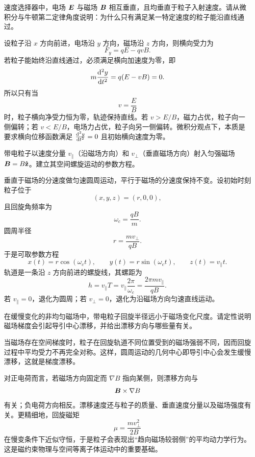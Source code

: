 \begin{classic}
速度选择器中，电场 $\vb*{E}$ 与磁场 $\vb*{B}$ 相互垂直，且均垂直于粒子入射速度。请从微积分与牛顿第二定律角度说明：为什么只有满足某一特定速度的粒子能沿直线通过。

\begin{center}
\end{center}

\begin{solution}
设粒子沿 $x$ 方向前进，电场沿 $y$ 方向，磁场沿 $z$ 方向，则横向受力为
\[
F_y=qE-qvB.
\]
若粒子能始终沿直线通过，必须满足横向加速度为零，即
\[
m\dv[2]{y}{t}=q(E-vB)=0.
\]
所以只有当
\[
v=\frac{E}{B}
\]
时，粒子横向净受力恒为零，轨迹保持直线。若 $v>E/B$，磁力占优，粒子向一侧偏转；若 $v<E/B$，电场力占优，粒子向另一侧偏转。微积分观点下，本质是要求横向位移函数满足 $\dv[2]{y}{t}=0$ 且初始横向速度为零。
\end{solution}
\end{classic}

\begin{competition}
带电粒子以速度分量 $v_\parallel$（沿磁场方向）和 $v_\perp$（垂直磁场方向）射入匀强磁场 $\vb*{B}=B\vu{z}$。建立其空间螺旋运动的参数方程。

\begin{solution}
垂直于磁场的分速度做匀速圆周运动，平行于磁场的分速度保持不变。设初始时刻粒子位于
\[
(x,y,z)=(r,0,0),
\]
且回旋角频率为
\[
\omega_c=\frac{qB}{m}.
\]
圆周半径
\[
r=\frac{mv_\perp}{qB}.
\]
于是可取参数方程
\[
x(t)=r\cos(\omega_c t),
\qquad
y(t)=r\sin(\omega_c t),
\qquad
z(t)=v_\parallel t.
\]
轨道是一条沿 $z$ 方向前进的螺旋线，其螺距为
\[
h=v_\parallel T=v_\parallel\frac{2\pi}{\omega_c}=\frac{2\pi mv_\parallel}{qB}.
\]
若 $v_\parallel=0$，退化为圆周；若 $v_\perp=0$，退化为沿磁场方向匀速直线运动。
\end{solution}
\end{competition}

\begin{competition}
在缓慢变化的非均匀磁场中，带电粒子回旋半径远小于磁场变化尺度。请定性说明磁场梯度会引起导引中心漂移，并给出漂移方向与哪些量有关。

\begin{solution}
当磁场存在空间梯度时，粒子在回旋轨道不同位置受到的磁场强弱不同，因而回旋过程中平均受力不再完全对称。这样，圆周运动的几何中心即导引中心会发生缓慢漂移，这就是梯度漂移。

对正电荷而言，若磁场方向固定而 $\nabla B$ 指向某侧，则漂移方向与
\[
\vb*{B}\times \nabla B
\]
有关；负电荷方向相反。漂移速度还与粒子的质量、垂直速度分量以及磁场强度有关。更精细地，回旋磁矩
\[
\mu=\frac{mv_\perp^2}{2B}
\]
在慢变条件下近似守恒，于是粒子会表现出“趋向磁场较弱侧”的平均动力学行为。这是磁约束物理与空间等离子体运动中的重要基础。
\end{solution}
\end{competition}

